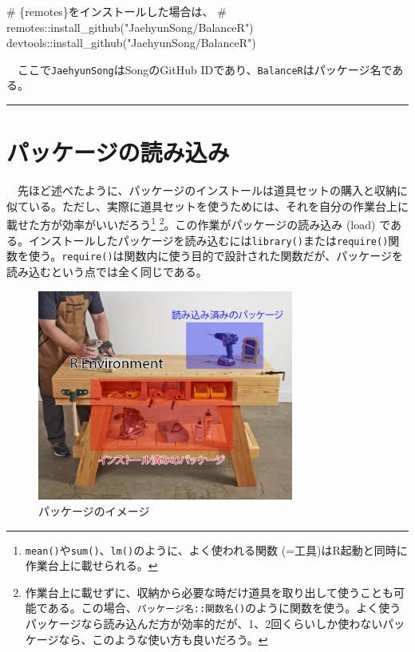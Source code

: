 \documentclass[
  a4paper,
  pandoc,
  ja=standard,
  jafont=haranoaji]{bxjsbook}
\newenvironment{Shaded}{\begin{snugshade}}{\end{snugshade}}
\newcommand{\CommentTok}[1]{\textcolor[rgb]{0.37,0.37,0.37}{#1}}
\newcommand{\FunctionTok}[1]{\textcolor[rgb]{0.28,0.35,0.67}{#1}}
\newcommand{\NormalTok}[1]{\textcolor[rgb]{0.00,0.48,0.65}{#1}}
\newcommand{\SpecialCharTok}[1]{\textcolor[rgb]{0.37,0.37,0.37}{#1}}
\newcommand{\StringTok}[1]{\textcolor[rgb]{0.13,0.47,0.30}{#1}}
\begin{document}
\begin{Shaded}
\begin{Highlighting}[numbers=left,,]
\CommentTok{\# \{remotes\}をインストールした場合は、}
\CommentTok{\# remotes::install\_github("JaehyunSong/BalanceR")}
\NormalTok{devtools}\SpecialCharTok{::}\FunctionTok{install\_github}\NormalTok{(}\StringTok{"JaehyunSong/BalanceR"}\NormalTok{)}
\end{Highlighting}
\end{Shaded}

　ここで\texttt{JaehyunSong}はSongのGitHub
IDであり、\texttt{BalanceR}はパッケージ名である。

\begin{center}\rule{0.5\linewidth}{0.5pt}\end{center}

\hypertarget{sec-packages_library}{%
\section{パッケージの読み込み}\label{sec-packages_library}}

　先ほど述べたように、パッケージのインストールは道具セットの購入と収納に似ている。ただし、実際に道具セットを使うためには、それを自分の作業台上に載せた方が効率がいいだろう\footnote{\texttt{mean()}や\texttt{sum()}、\texttt{lm()}のように、よく使われる関数
  (=工具)はR起動と同時に作業台上に載せられる。}
\footnote{作業台上に載せずに、収納から必要な時だけ道具を取り出して使うことも可能である。この場合、\texttt{パッケージ名::関数名()}のように関数を使う。よく使うパッケージなら読み込んだ方が効率的だが、1、2回くらいしか使わないパッケージなら、このような使い方も良いだろう。}。この作業がパッケージの読み込み
(load)
である。インストールしたパッケージを読み込むには\texttt{library()}または\texttt{require()}関数を使う。\texttt{require()}は関数内に使う目的で設計された関数だが、パッケージを読み込むという点では全く同じである。

\begin{figure}

{\centering \includegraphics[width=0.75\textwidth,height=\textheight]{./Figs/Installation/Package_Workbench.jpg}

}

\caption{\label{fig-installation_package}パッケージのイメージ}

\end{figure}
\end{document}
